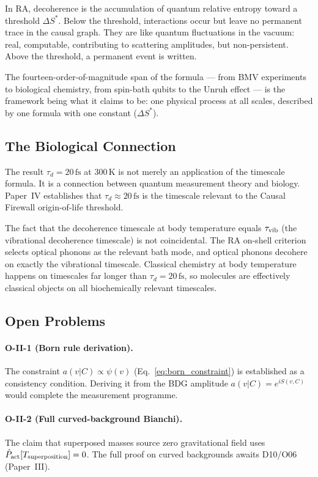 \documentclass[12pt,a4paper]{article}
\begin{document}
In RA, decoherence is the accumulation of quantum relative entropy toward a threshold $\Delta S^*$.  Below the threshold, interactions occur but leave no permanent trace in the causal graph.  They are like quantum fluctuations in the vacuum: real, computable, contributing to scattering amplitudes, but non-persistent.  Above the threshold, a permanent event is written.

The fourteen-order-of-magnitude span of the formula --- from BMV experiments to biological chemistry, from spin-bath qubits to the Unruh effect --- is the framework being what it claims to be: one physical process at all scales, described by one formula with one constant ($\Delta S^*$).

\subsection{The Biological Connection}

The result $\tau_d=20\,\mathrm{fs}$ at $300\,\mathrm{K}$ is not merely an application of the timescale formula.  It is a connection between quantum measurement theory and biology.  Paper~IV \cite{RA_P4} establishes that $\tau_d\approx20\,\mathrm{fs}$ is the timescale relevant to the Causal Firewall origin-of-life threshold.

The fact that the decoherence timescale at body temperature equals $\tau_{\rm vib}$ (the vibrational decoherence timescale) is not coincidental.  The RA on-shell criterion selects optical phonons as the relevant bath mode, and optical phonons decohere on exactly the vibrational timescale.  Classical chemistry at body temperature happens on timescales far longer than $\tau_d=20\,\mathrm{fs}$, so molecules are effectively classical objects on all biochemically relevant timescales.

\subsection{Open Problems}

\paragraph{O-II-1 (Born rule derivation).}  The constraint $a(v|C)\propto\psi(v)$ (Eq.~\ref{eq:born_constraint}) is established as a consistency condition.  Deriving it from the BDG amplitude $a(v|C)=e^{iS(v,C)}$ would complete the measurement programme.

\paragraph{O-II-2 (Full curved-background Bianchi).}  The claim that superposed masses source zero gravitational field uses $\hat{P}_{\mathrm{act}}[T_{\rm superposition}]=0$.  The full proof on curved backgrounds awaits D10/O06 (Paper~III).
\end{document}
